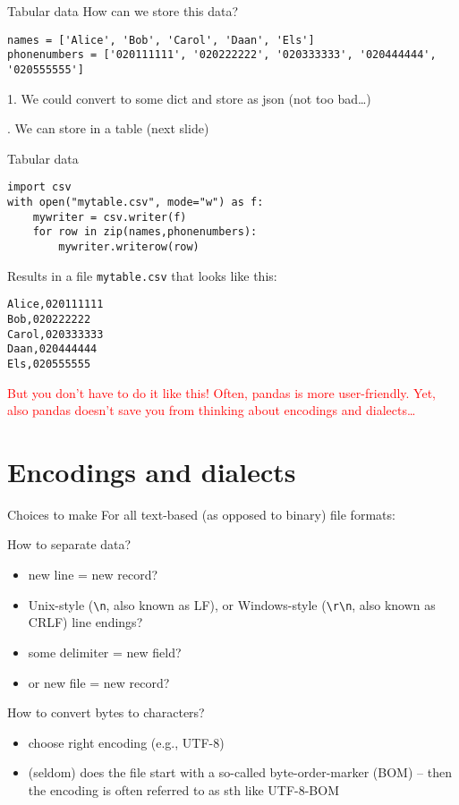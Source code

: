 \documentclass[compress]{beamer}
\begin{document}
\begin{frame}[fragile]{Tabular data}
How can we store this data?
\begin{lstlisting}
names = ['Alice', 'Bob', 'Carol', 'Daan', 'Els']
phonenumbers = ['020111111', '020222222', '020333333', '020444444', '020555555']
\end{lstlisting}
\pause

1. We could convert to some dict and store as json (not too bad\ldots)

. We can store in a table
(next slide)
\end{frame}

\begin{frame}[fragile]{Tabular data}
\begin{lstlisting}
import csv
with open("mytable.csv", mode="w") as f:
    mywriter = csv.writer(f)
    for row in zip(names,phonenumbers):
        mywriter.writerow(row)
\end{lstlisting}
	
Results in a file \texttt{mytable.csv} that looks like this:
\begin{lstlisting}
Alice,020111111
Bob,020222222
Carol,020333333
Daan,020444444
Els,020555555
\end{lstlisting}
\pause
\textcolor{red}{But you don't have to do it like this! Often, pandas is more user-friendly. Yet, also pandas doesn't save you from thinking about encodings and dialects\ldots}
\end{frame}


\section{Encodings and dialects}


\begin{frame}{Choices to make}
For all text-based (as opposed to binary) file formats:
\begin{block}{How to separate data?}
	\begin{itemize}
		\item new line = new record?
		\item Unix-style (\texttt{\textbackslash n}, also known as LF),  or Windows-style (\texttt{\textbackslash r\textbackslash n}, also known as CRLF) line endings?
		\item some delimiter = new field?
		\item or new file = new record?
	\end{itemize}
\end{block}
\pause
\begin{block}{How to convert bytes to characters?}
	\begin{itemize}
		\item choose right encoding (e.g., UTF-8)
		\item (seldom) does the file start with a so-called byte-order-marker (BOM) -- then the encoding is often referred to as sth like UTF-8-BOM
	\end{itemize}
\end{block}
\end{frame}
\end{document}
